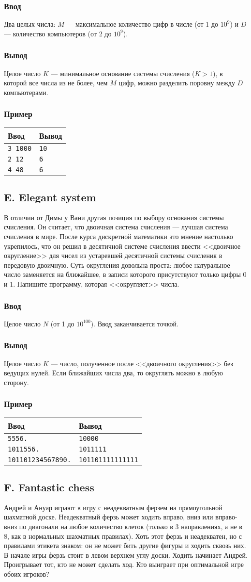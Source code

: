 \documentclass[10pt, a4paper]{article}
\newcommand{\informat}[1]
{
	\subsubsection*{Ввод} #1
}
\newcommand{\outformat}[1]
{
	\subsubsection*{Вывод} #1
}
\newcommand{\exampleee}[6]
{
	\subsubsection*{Пример}
	\noindent
	\begin{center}
	\begin{tabularx}{\linewidth}{|X|X|}
	\hline
	Ввод 	& Вывод  	\\
	\hline
	{\tt #1} & {\tt #2}	\\
	\hline
	{\tt #3} & {\tt #4}	\\
	\hline
	{\tt #5} & {\tt #6}	\\
	\hline
	\end{tabularx}
	\end{center}
}
\begin{document}
\informat{Два целых числа: $M$ --- максимальное количество цифр в числе (от 1 до $10^9$) и $D$ --- количество компьютеров (от 2 до $10^9$).}

\outformat{Целое число $K$ --- минимальное основание системы счисления ($K > 1$), в которой все числа из не более, чем $M$ цифр, можно разделить поровну между $D$ компьютерами.}

\exampleee{3 1000}{10}{2 12}{6}{4 48}{6}



\subsection*{E. Elegant system}
В отличии от Димы у Вани другая позиция по выбору основания системы счисления. Он считает, что двоичная система счисления --- лучшая система счисления в мире. После курса дискретной математики это мнение настолько укрепилось, что он решил в десятичной системе счисления ввести <<двоичное округление>> для чисел из устаревшей десятичной системы счисления в передовую двоичную. Суть округления довольна проста: любое натуральное число заменяется на ближайшее, в записи которого присутствуют только цифры 0 и 1.  Напишите программу, которая <<округляет>> числа. 

\informat{Целое число $N$ (от 1 до $10^{100}$). Ввод заканчивается точкой.}

\outformat{Целое число $K$ --- число, полученное после <<двоичного округления>> без ведущих нулей. Если ближайших числа два, то округлять можно в любую сторону.}

\exampleee{5556.}{10000}{1011556.}{1011111}{101101234567890.}{101101111111111}



\subsection*{F. Fantastic chess}

Андрей и Ануар играют в игру с неадекватным ферзем на прямоугольной шахматной доске. Неадекватный ферзь может ходить вправо, вниз или вправо-вниз по диагонали на любое количество клеток (только в 3 направлениях, а не в 8, как в нормальных шахматных правилах). Хоть этот ферзь и неадекватен, но с правилами этикета знаком: он не может бить другие фигуры и ходить сквозь них. В начале игры ферзь стоит в левом верхнем углу доски. Ходить начинает Андрей. Проигрывает тот, кто не может сделать ход. Кто выиграет при оптимальной игре обоих игроков?
\end{document}
